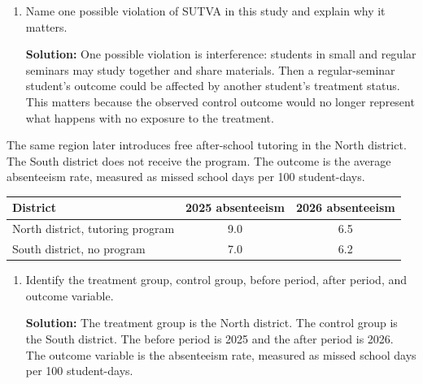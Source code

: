 \documentclass[11pt]{exam}
\begin{document}
\begin{questions}
\begin{enumerate}[leftmargin = 0.5cm, label = (\alph*), rightmargin = 0.2cm]
    \begin{solutionorbox}[6.2cm]
    \textbf{Solution:}
    \[
    \widehat{SATE}=\bar Y_1-\bar Y_0=74-70=4.
    \]
    The small-seminar group scored 4 points higher on average than the regular-seminar group. Because assignment was random, this difference can be interpreted as an estimate of the causal effect of small seminars on final exam scores for the study sample, assuming the treatment is well defined and there are no relevant spillovers.
    \end{solutionorbox}

    \item Name one possible violation of SUTVA in this study and explain why it matters.

    \begin{solutionorbox}[5.8cm]
    \textbf{Solution:} One possible violation is interference: students in small and regular seminars may study together and share materials. Then a regular-seminar student's outcome could be affected by another student's treatment status. This matters because the observed control outcome would no longer represent what happens with no exposure to the treatment.
    \end{solutionorbox}
\end{enumerate}

\newpage
\question[2.5]
The same region later introduces free after-school tutoring in the North district. The South district does not receive the program. The outcome is the average absenteeism rate, measured as missed school days per 100 student-days.

\begin{center}
\begin{tabular}{lcc}
\toprule
District & 2025 absenteeism & 2026 absenteeism \\
\midrule
North district, tutoring program & 9.0 & 6.5 \\
South district, no program       & 7.0 & 6.2 \\
\bottomrule
\end{tabular}
\end{center}

\begin{enumerate}[leftmargin = 0.5cm, label = (\alph*), rightmargin = 0.2cm]
    \item Identify the treatment group, control group, before period, after period, and outcome variable.

    \begin{solutionorbox}[5.8cm]
    \textbf{Solution:} The treatment group is the North district. The control group is the South district. The before period is 2025 and the after period is 2026. The outcome variable is the absenteeism rate, measured as missed school days per 100 student-days.
    \end{solutionorbox}


\end{enumerate}
\end{questions}
\end{document}
